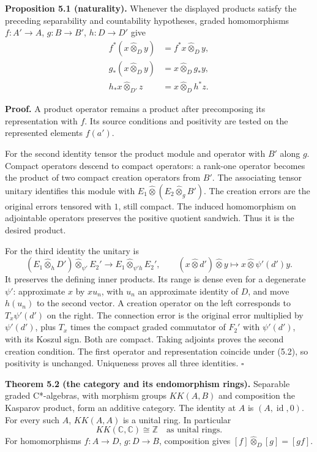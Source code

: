 \documentclass[
  11pt,
]{article}
\begin{document}
\textbf{Proposition 5.1 (naturality).} Whenever the displayed products
satisfy the preceding separability and countability hypotheses, graded
homomorphisms \(f:A'\to A\), \(g:B\to B'\), \(h:D\to D'\) give \[
\begin{aligned}
f^*(x\widehat\otimes_D y)&=f^*x\widehat\otimes_D y,\\
g_*(x\widehat\otimes_D y)&=x\widehat\otimes_D g_*y,\\
h_*x\widehat\otimes_{D'}z&=x\widehat\otimes_D h^*z.
\end{aligned}
\tag{5.1}
\]

\textbf{Proof.} A product operator remains a product after precomposing
its representation with \(f\). Its source conditions and positivity are
tested on the represented elements \(f(a')\).

For the second identity tensor the product module and operator with
\(B'\) along \(g\). Compact operators descend to compact operators: a
rank-one operator becomes the product of two compact creation operators
from \(B'\). The associating tensor unitary identifies this module with
\(E_1\widehat\otimes(E_2\widehat\otimes_g B')\). The creation errors are
the original errors tensored with \(1\), still compact. The induced
homomorphism on adjointable operators preserves the positive quotient
sandwich. Thus it is the desired product.

For the third identity the unitary is \[
(E_1\widehat\otimes_h D')\widehat\otimes_{\psi'}E_2'
\longrightarrow E_1\widehat\otimes_{\psi'h}E_2',\qquad
(x\widehat\otimes d')\widehat\otimes y
\longmapsto x\widehat\otimes\psi'(d')y.
\tag{5.2}
\] It preserves the defining inner products. Its range is dense even for
a degenerate \(\psi'\): approximate \(x\) by \(xu_n\), with \(u_n\) an
approximate identity of \(D\), and move \(h(u_n)\) to the second vector.
A creation operator on the left corresponds to \(T_x\psi'(d')\) on the
right. The connection error is the original error multiplied by
\(\psi'(d')\), plus \(T_x\) times the compact graded commutator of
\(F_2'\) with \(\psi'(d')\), with its Koszul sign. Both are compact.
Taking adjoints proves the second creation condition. The first operator
and representation coincide under (5.2), so positivity is unchanged.
Uniqueness proves all three identities. \(\square\)

\textbf{Theorem 5.2 (the category and its endomorphism rings).}
Separable graded C*-algebras, with morphism groups \(KK(A,B)\) and
composition the Kasparov product, form an additive category. The
identity at \(A\) is \((A,\operatorname{id},0)\). For every such \(A\),
\(KK(A,A)\) is a unital ring. In particular \[
KK(\mathbb C,\mathbb C)\cong\mathbb Z
\quad\text{as unital rings}.
\tag{5.3}
\] For homomorphisms \(f:A\to D\), \(g:D\to B\), composition gives
\([f]\widehat\otimes_D[g]=[g f]\).
\end{document}
